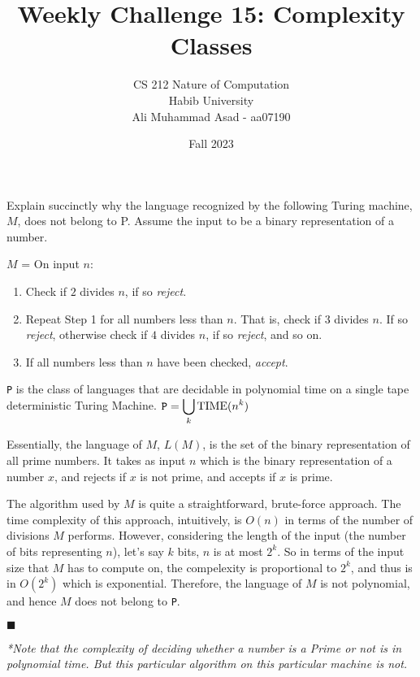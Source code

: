 \documentclass[a4paper]{exam}
\title{Weekly Challenge 15: Complexity Classes}
\author{CS 212 Nature of Computation\\Habib University\\Ali Muhammad Asad - aa07190}
\date{Fall 2023}
\begin{document}
\maketitle

\begin{questions}


  Explain succinctly why the language recognized by the following Turing machine, $M$, does not belong to P. Assume the input to be a binary representation of a number.

  $M$ = On input $n$:
  \begin{enumerate}
    \item Check if $2$ divides $n$, if so \textit{reject}.
    \item Repeat Step 1 for all numbers less than $n$. That is, check if $3$ divides $n$. If so \textit{reject}, otherwise check if $4$ divides $n$, if so \textit{reject}, and so on.
    \item If all numbers less than $n$ have been checked, \textit{accept}.
  \end{enumerate}
  \begin{solution}
    \texttt{P} is the class of languages that are decidable in polynomial time on a single tape deterministic Turing Machine. $ \text{\texttt{P}} = \displaystyle\bigcup_k \text{TIME}(n^k) $

    Essentially, the language of $M$, $L(M)$, is the set of the binary representation of all prime numbers. It takes as input $n$ which is the binary representation of a number $x$, and rejects if $x$ is not prime, and accepts if $x$ is prime.

    The algorithm used by $M$ is quite a straightforward, brute-force approach. The time complexity of this approach, intuitively, is $ O(n) $ in terms of the number of divisions $M$ performs. However, considering the length of the input (the number of bits representing $n$), let's say $k$ bits, $n$ is at most $ 2^k $. So in terms of the input size that $M$ has to compute on, the compelexity is proportional to $ 2^k $, and thus is in $ O(2^k) $ which is exponential. Therefore, the language of $M$ is not polynomial, and hence $M$ does not belong to \texttt{P}.

    \begin{flushright}
      $\blacksquare$
    \end{flushright}

    \textit{*Note that the complexity of deciding whether a number is a Prime or not is in polynomial time. But this particular algorithm on this particular machine is not.}


\end{solution}
\end{questions}
\end{document}
